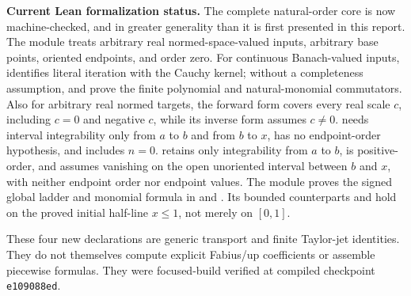 \documentclass[11pt,oneside]{article}
\theoremstyle{definition}
\theoremstyle{remark}
\newcommand{\1}{\mathbf 1}
\begin{document}
\begin{boxedremark}
\textbf{Current Lean formalization status.}
The complete natural-order core is now machine-checked, and in greater
generality than it is first presented in this report.  The module
 treats arbitrary real
normed-space-valued inputs, arbitrary base points, oriented endpoints, and
order zero.  For continuous Banach-valued inputs,
 identifies literal iteration
with the Cauchy kernel; without a completeness assumption,
 and
 prove the finite polynomial and
natural-monomial commutators.  Also for arbitrary real normed targets, the
forward form  covers every real scale \(c\), including
\(c=0\) and negative \(c\), while its inverse form
 assumes \(c\ne0\).
 needs interval integrability only
from \(a\) to \(b\) and from \(b\) to \(x\), has no endpoint-order hypothesis,
and includes \(n=0\).
 retains only integrability
from \(a\) to \(b\), is positive-order, and assumes vanishing on
the open unoriented interval between \(b\) and \(x\), with neither endpoint
order nor endpoint values.  The
module  proves the signed global
ladder and monomial formula in
 and
.  Its bounded counterparts
 and
 hold on the proved
initial half-line $x\le1$, not merely on $[0,1]$.

These four new declarations are generic transport and finite Taylor-jet
identities.  They do not themselves compute explicit Fabius/up coefficients
or assemble piecewise formulas.  They were focused-build verified at compiled
checkpoint \texttt{e109088ed}.


\end{boxedremark}
\end{document}
